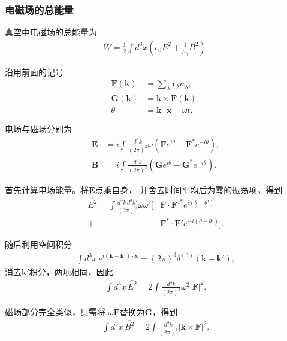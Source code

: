 \documentclass{article}
\begin{document}
\subsubsection{电磁场的总能量}

真空中电磁场的总能量为
\begin{align}
    W=\frac12\int d^3x
    \left(
    \epsilon_0 E^2+\frac{1}{\mu_0}B^2
    \right).
\end{align}

沿用前面的记号
\begin{align}
    \mathbf F(\mathbf k)
    &=\sum_\lambda \boldsymbol\epsilon_\lambda a_\lambda,\\
    \mathbf G(\mathbf k)
    &=\mathbf k\times\mathbf F(\mathbf k),\\
    \theta&=\mathbf k\cdot\mathbf x-\omega t.
\end{align}

电场与磁场分别为
\begin{align}
    \mathbf E
    &=i\int\frac{d^3k}{(2\pi)^3}\omega
    \left(
    \mathbf F e^{i\theta}
    -\mathbf F^*e^{-i\theta}
    \right),\\
    \mathbf B
    &=i\int\frac{d^3k}{(2\pi)^3}
    \left(
    \mathbf G e^{i\theta}
    -\mathbf G^*e^{-i\theta}
    \right).
\end{align}

首先计算电场能量。将$\mathbf E$点乘自身，
并舍去时间平均后为零的振荡项，得到
\begin{align}
    \overline{E^2}
    =\int\frac{d^3k\,d^3k'}{(2\pi)^6}
    \omega\omega'
    \Big[
    &\mathbf F\cdot\mathbf F'^*
    e^{i(\theta-\theta')}\\
    +&\mathbf F^*\cdot\mathbf F'
    e^{-i(\theta-\theta')}
    \Big].
\end{align}

随后利用空间积分
\begin{align}
    \int d^3x\,
    e^{i(\mathbf k-\mathbf k')\cdot\mathbf x}
    =(2\pi)^3\delta^{(3)}(\mathbf k-\mathbf k'),
\end{align}
消去$\mathbf k'$积分，两项相同，因此
\begin{align}
    \boxed{
    \int d^3x\,\overline{E^2}
    =2\int\frac{d^3k}{(2\pi)^3}
    \omega^2|\mathbf F|^2
    }.
\end{align}

磁场部分完全类似，只需将
$\omega\mathbf F$替换为$\mathbf G$，得到
\begin{align}
    \boxed{
    \int d^3x\,\overline{B^2}
    =2\int\frac{d^3k}{(2\pi)^3}
    |\mathbf k\times\mathbf F|^2
    }.
\end{align}
\end{document}
